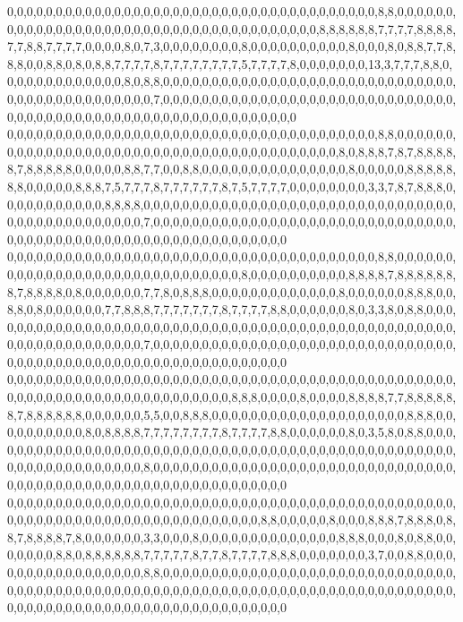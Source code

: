 0,0,0,0,0,0,0,0,0,0,0,0,0,0,0,0,0,0,0,0,0,0,0,0,0,0,0,0,0,0,0,0,0,0,0,0,0,0,8,8,0,0,0,0,0,0,0,0,0,0,0,0,0,0,0,0,0,0,0,0,0,0,0,0,0,0,0,0,0,0,0,0,0,0,0,0,0,0,8,8,8,8,8,8,7,7,7,7,8,8,8,8,7,7,8,8,7,7,7,7,0,0,0,0,8,0,7,3,0,0,0,0,0,0,0,0,8,0,0,0,0,0,0,0,0,0,0,8,0,0,0,8,0,8,8,7,7,8,8,8,0,0,8,8,0,8,0,8,8,7,7,7,7,8,7,7,7,7,7,7,7,7,5,7,7,7,7,8,0,0,0,0,0,0,0,13,3,7,7,7,8,8,0,0,0,0,0,0,0,0,0,0,0,0,0,8,0,8,8,0,0,0,0,0,0,0,0,0,0,0,0,0,0,0,0,0,0,0,0,0,0,0,0,0,0,0,0,0,0,0,0,0,0,0,0,0,0,0,0,0,0,0,0,0,7,0,0,0,0,0,0,0,0,0,0,0,0,0,0,0,0,0,0,0,0,0,0,0,0,0,0,0,0,0,0,0,0,0,0,0,0,0,0,0,0,0,0,0,0,0,0,0,0,0,0,0,0,0,0,0,0,0,0,0,0
0,0,0,0,0,0,0,0,0,0,0,0,0,0,0,0,0,0,0,0,0,0,0,0,0,0,0,0,0,0,0,0,0,0,0,0,0,0,8,8,0,0,0,0,0,0,0,0,0,0,0,0,0,0,0,0,0,0,0,0,0,0,0,0,0,0,0,0,0,0,0,0,0,0,0,0,0,0,0,0,8,0,8,8,8,7,8,7,8,8,8,8,8,7,8,8,8,8,8,0,0,0,0,0,8,8,7,7,0,0,8,8,0,0,0,0,0,0,0,0,0,0,0,0,0,0,0,8,0,0,0,0,0,8,8,8,8,8,8,8,0,0,0,0,0,8,8,8,7,5,7,7,7,8,7,7,7,7,7,7,8,7,5,7,7,7,7,0,0,0,0,0,0,0,0,3,3,7,8,7,8,8,8,0,0,0,0,0,0,0,0,0,0,0,8,8,8,8,0,0,0,0,0,0,0,0,0,0,0,0,0,0,0,0,0,0,0,0,0,0,0,0,0,0,0,0,0,0,0,0,0,0,0,0,0,0,0,0,0,0,0,0,0,0,7,0,0,0,0,0,0,0,0,0,0,0,0,0,0,0,0,0,0,0,0,0,0,0,0,0,0,0,0,0,0,0,0,0,0,0,0,0,0,0,0,0,0,0,0,0,0,0,0,0,0,0,0,0,0,0,0,0,0,0,0
0,0,0,0,0,0,0,0,0,0,0,0,0,0,0,0,0,0,0,0,0,0,0,0,0,0,0,0,0,0,0,0,0,0,0,0,0,0,8,8,0,0,0,0,0,0,0,0,0,0,0,0,0,0,0,0,0,0,0,0,0,0,0,0,0,0,0,0,0,0,8,0,0,0,0,0,0,0,0,0,0,8,8,8,8,7,8,8,8,8,8,8,8,7,8,8,8,8,0,8,0,0,0,0,0,0,7,7,8,0,8,8,8,0,0,0,0,0,0,0,0,0,0,0,0,0,8,0,0,0,0,0,0,8,8,8,0,0,8,8,0,8,0,0,0,0,0,0,7,7,8,8,8,7,7,7,7,7,7,7,8,7,7,7,7,8,8,0,0,0,0,0,0,8,0,3,3,8,0,8,8,0,0,0,0,0,0,0,0,0,0,0,0,0,0,0,0,0,0,0,0,0,0,0,0,0,0,0,0,0,0,0,0,0,0,0,0,0,0,0,0,0,0,0,0,0,0,0,0,0,0,0,0,0,0,0,0,0,0,0,0,0,0,0,7,0,0,0,0,0,0,0,0,0,0,0,0,0,0,0,0,0,0,0,0,0,0,0,0,0,0,0,0,0,0,0,0,0,0,0,0,0,0,0,0,0,0,0,0,0,0,0,0,0,0,0,0,0,0,0,0,0,0,0,0
0,0,0,0,0,0,0,0,0,0,0,0,0,0,0,0,0,0,0,0,0,0,0,0,0,0,0,0,0,0,0,0,0,0,0,0,0,0,0,0,0,0,0,0,0,0,0,0,0,0,0,0,0,0,0,0,0,0,0,0,0,0,0,0,0,0,0,0,0,8,8,8,0,0,0,0,8,0,0,0,0,8,8,8,8,7,7,8,8,8,8,8,8,7,8,8,8,8,8,8,0,0,0,0,0,0,5,5,0,0,8,8,8,0,0,0,0,0,0,0,0,0,0,0,0,0,0,0,0,0,0,0,0,8,8,8,0,0,0,0,0,0,0,0,0,0,8,0,8,8,8,8,7,7,7,7,7,7,7,7,8,7,7,7,7,8,8,0,0,0,0,0,0,8,0,3,5,8,0,8,8,0,0,0,0,0,0,0,0,0,0,0,0,0,0,0,0,0,0,0,0,0,0,0,0,0,0,0,0,0,0,0,0,0,0,0,0,0,0,0,0,0,0,0,0,0,0,0,0,0,0,0,0,0,0,0,0,0,0,0,0,0,0,0,8,0,0,0,0,0,0,0,0,0,0,0,0,0,0,0,0,0,0,0,0,0,0,0,0,0,0,0,0,0,0,0,0,0,0,0,0,0,0,0,0,0,0,0,0,0,0,0,0,0,0,0,0,0,0,0,0,0,0,0,0
0,0,0,0,0,0,0,0,0,0,0,0,0,0,0,0,0,0,0,0,0,0,0,0,0,0,0,0,0,0,0,0,0,0,0,0,0,0,0,0,0,0,0,0,0,0,0,0,0,0,0,0,0,0,0,0,0,0,0,0,0,0,0,0,0,0,0,0,0,0,0,0,8,8,0,0,0,0,0,8,0,0,0,8,8,8,7,8,8,8,0,8,8,7,8,8,8,8,7,8,0,0,0,0,0,0,3,3,0,0,0,8,0,0,0,0,0,0,0,0,0,0,0,0,0,0,8,8,8,0,0,0,8,0,8,8,0,0,0,0,0,0,0,8,8,0,8,8,8,8,8,8,7,7,7,7,7,8,7,7,8,7,7,7,7,8,8,8,0,0,0,0,0,0,0,3,7,0,0,8,8,0,0,0,0,0,0,0,0,0,0,0,0,0,0,0,0,0,8,8,0,0,0,0,0,0,0,0,0,0,0,0,0,0,0,0,0,0,0,0,0,0,0,0,0,0,0,0,0,0,0,0,0,0,0,0,0,0,0,0,0,0,0,0,0,0,0,0,0,0,0,0,0,0,0,0,0,0,0,0,0,0,0,0,0,0,0,0,0,0,0,0,0,0,0,0,0,0,0,0,0,0,0,0,0,0,0,0,0,0,0,0,0,0,0,0,0,0,0,0,0,0,0,0,0
